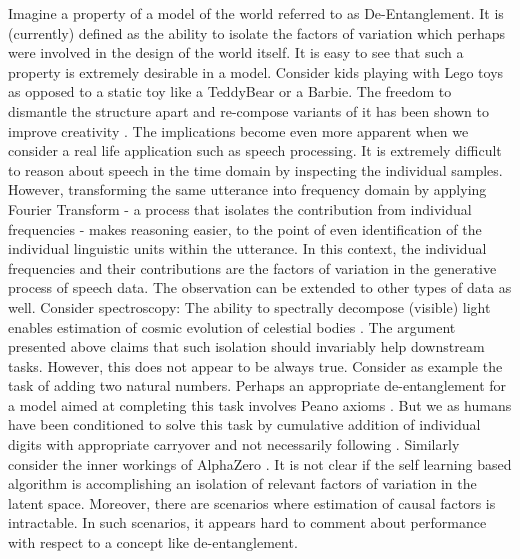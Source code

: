 Imagine a property of a model of the world referred to as De-Entanglement. It is (currently) defined as the ability to isolate the factors of variation which perhaps were involved in the design of the world itself. It is easy to see that such a property is extremely desirable in a model. Consider kids playing with Lego toys as opposed to a static toy like a TeddyBear or a Barbie. The freedom to dismantle the structure apart and re-compose variants of it has been shown to improve creativity \cite{gauntlett2014lego}. The implications become even more apparent when we consider a real life application such as speech processing. It is extremely difficult to reason about speech in the time domain by inspecting the individual samples. However, transforming the same utterance into frequency domain by applying Fourier Transform - a process that isolates the contribution from individual frequencies - makes reasoning easier, to the point of even identification of the individual linguistic units within the utterance. In this context, the individual frequencies and their contributions are the factors of variation in the generative process of speech data. The observation can be extended to other types of data as well. Consider spectroscopy: The ability to spectrally decompose (visible) light enables estimation of cosmic evolution of celestial bodies \cite{stellar_evolution}. The argument presented above claims that such isolation should invariably help downstream tasks. However, this does not appear to be always true. Consider as example the task of adding two natural numbers. Perhaps an appropriate de-entanglement for a model aimed at completing this task involves Peano axioms \cite{peano_axioms}. But we as humans have been conditioned to solve this task by cumulative addition of individual digits with appropriate carryover and not necessarily following \cite{peano_axioms}. Similarly consider  the inner workings of AlphaZero \cite{alpha_zero_withouthumans}. It is not clear if the self learning based algorithm is accomplishing an isolation of relevant factors of variation in the latent space. Moreover, there are scenarios where estimation of causal factors is intractable. In such scenarios, it appears hard to comment about performance with respect to a concept like de-entanglement. 


